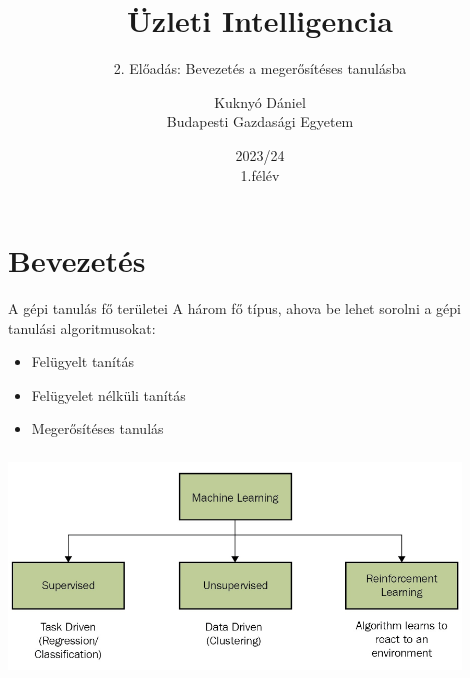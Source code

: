 \documentclass[english, aspectratio=169]{beamer}
\makeatletter
\newcommand\makebeamertitle{\frame{\maketitle}}
\let\origtableofcontents=\tableofcontents
\def\tableofcontents{\@ifnextchar[{\origtableofcontents}{\gobbletableofcontents}}
\def\gobbletableofcontents#1{\origtableofcontents}
\makeatother
\begin{document}
\section{Bevezetés}
\title[]{Üzleti Intelligencia}
\subtitle{2. Előadás: Bevezetés a megerősítéses tanulásba}
\author[Kuknyó Dániel]{Kuknyó Dániel\\Budapesti Gazdasági Egyetem}
\date{2023/24\\1.félév}
\makebeamertitle

\begin{frame}
\tableofcontents{}
\end{frame}

\begin{frame}
\tableofcontents[currentsection]
\end{frame}

\begin{frame}{A gépi tanulás fő területei}
A három fő típus, ahova be lehet sorolni a gépi tanulási algoritmusokat:
\begin{itemize}
	\item Felügyelt tanítás
	\item Felügyelet nélküli tanítás
	\item Megerősítéses tanulás
\end{itemize}
\begin{center}
\includegraphics[height=6cm, width=12cm, keepaspectratio]{images/reinf_0.png}
\end{center}
\end{frame}
\end{document}
